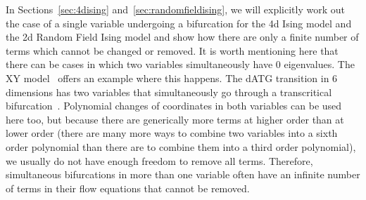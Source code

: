 \documentclass[
 reprint,
 amsmath,amssymb,
 aps, superscriptaddress, pre
]{revtex4-1}
\begin{document}
In Sections~\ref{sec:4dising} and~\ref{sec:randomfieldising}, we will explicitly work out the case of a single variable undergoing a bifurcation for the 4d Ising model and the 2d Random Field Ising model and show how there are only a finite number of terms which cannot be changed or removed. It is worth mentioning here that there can be cases in which two variables simultaneously have 0 eigenvalues. The XY model~\cite{kosterlitz1974critical} offers an example where this happens. The dATG transition in 6 dimensions has two variables that simultaneously go through a transcritical bifurcation~\cite{charbonneau2017nontrivial, Yaida18}. Polynomial changes of coordinates in both variables can be used here too, but because there are generically more terms at higher order than at lower order (there are many more ways to combine two variables into a sixth order polynomial than there are to combine them into a third order polynomial), we usually do not have enough freedom to remove all terms. Therefore, simultaneous bifurcations in more than one variable often have an infinite number of terms in their flow equations that cannot be removed.


\end{document}
